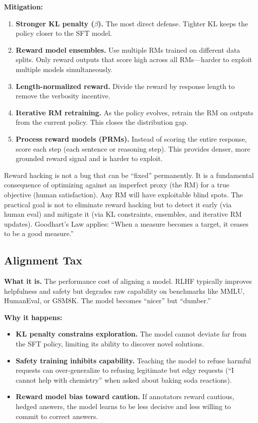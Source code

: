 \textbf{Mitigation:}
\begin{enumerate}
    \item \textbf{Stronger KL penalty ($\beta$).} The most direct defense. Tighter KL keeps the policy closer to the SFT model.
    \item \textbf{Reward model ensembles.} Use multiple RMs trained on different data splits. Only reward outputs that score high across all RMs---harder to exploit multiple models simultaneously.
    \item \textbf{Length-normalized reward.} Divide the reward by response length to remove the verbosity incentive.
    \item \textbf{Iterative RM retraining.} As the policy evolves, retrain the RM on outputs from the current policy. This closes the distribution gap.
    \item \textbf{Process reward models (PRMs).} Instead of scoring the entire response, score each step (each sentence or reasoning step). This provides denser, more grounded reward signal and is harder to exploit.
\end{enumerate}

\begin{warningbox}
Reward hacking is not a bug that can be ``fixed'' permanently. It is a fundamental consequence of optimizing against an imperfect proxy (the RM) for a true objective (human satisfaction). Any RM will have exploitable blind spots. The practical goal is not to eliminate reward hacking but to detect it early (via human eval) and mitigate it (via KL constraints, ensembles, and iterative RM updates). Goodhart's Law applies: ``When a measure becomes a target, it ceases to be a good measure.''
\end{warningbox}

\subsection{Alignment Tax}

\textbf{What it is.} The performance cost of aligning a model. RLHF typically improves helpfulness and safety but degrades raw capability on benchmarks like MMLU, HumanEval, or GSM8K. The model becomes ``nicer'' but ``dumber.''

\textbf{Why it happens:}
\begin{itemize}
    \item \textbf{KL penalty constrains exploration.} The model cannot deviate far from the SFT policy, limiting its ability to discover novel solutions.
    \item \textbf{Safety training inhibits capability.} Teaching the model to refuse harmful requests can over-generalize to refusing legitimate but edgy requests (``I cannot help with chemistry'' when asked about baking soda reactions).
    \item \textbf{Reward model bias toward caution.} If annotators reward cautious, hedged answers, the model learns to be less decisive and less willing to commit to correct answers.
\end{itemize}

